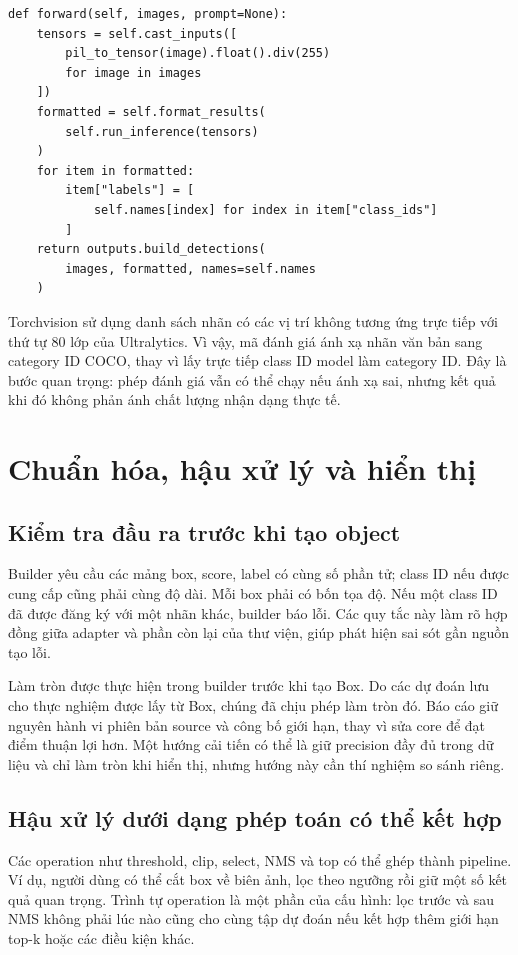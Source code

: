 \clearpage
\noindent\begin{minipage}{\linewidth}
\begin{lstlisting}[caption={Phần forward của FasterDetector trong mã thực nghiệm}]
def forward(self, images, prompt=None):
    tensors = self.cast_inputs([
        pil_to_tensor(image).float().div(255)
        for image in images
    ])
    formatted = self.format_results(
        self.run_inference(tensors)
    )
    for item in formatted:
        item["labels"] = [
            self.names[index] for index in item["class_ids"]
        ]
    return outputs.build_detections(
        images, formatted, names=self.names
    )
\end{lstlisting}
\vspace{4pt}
\end{minipage}

Torchvision sử dụng danh sách nhãn có các vị trí không tương ứng trực tiếp với thứ tự 80 lớp của Ultralytics. Vì vậy, mã đánh giá ánh xạ nhãn văn bản sang category ID COCO, thay vì lấy trực tiếp class ID model làm category ID. Đây là bước quan trọng: phép đánh giá vẫn có thể chạy nếu ánh xạ sai, nhưng kết quả khi đó không phản ánh chất lượng nhận dạng thực tế.

\section{Chuẩn hóa, hậu xử lý và hiển thị}
\subsection{Kiểm tra đầu ra trước khi tạo object}
Builder yêu cầu các mảng box, score, label có cùng số phần tử; class ID nếu được cung cấp cũng phải cùng độ dài. Mỗi box phải có bốn tọa độ. Nếu một class ID đã được đăng ký với một nhãn khác, builder báo lỗi. Các quy tắc này làm rõ hợp đồng giữa adapter và phần còn lại của thư viện, giúp phát hiện sai sót gần nguồn tạo lỗi.

Làm tròn được thực hiện trong builder trước khi tạo Box. Do các dự đoán lưu cho thực nghiệm được lấy từ Box, chúng đã chịu phép làm tròn đó. Báo cáo giữ nguyên hành vi phiên bản source và công bố giới hạn, thay vì sửa core để đạt điểm thuận lợi hơn. Một hướng cải tiến có thể là giữ precision đầy đủ trong dữ liệu và chỉ làm tròn khi hiển thị, nhưng hướng này cần thí nghiệm so sánh riêng.

\subsection{Hậu xử lý dưới dạng phép toán có thể kết hợp}
Các operation như threshold, clip, select, NMS và top có thể ghép thành pipeline. Ví dụ, người dùng có thể cắt box về biên ảnh, lọc theo ngưỡng rồi giữ một số kết quả quan trọng. Trình tự operation là một phần của cấu hình: lọc trước và sau NMS không phải lúc nào cũng cho cùng tập dự đoán nếu kết hợp thêm giới hạn top-k hoặc các điều kiện khác.

